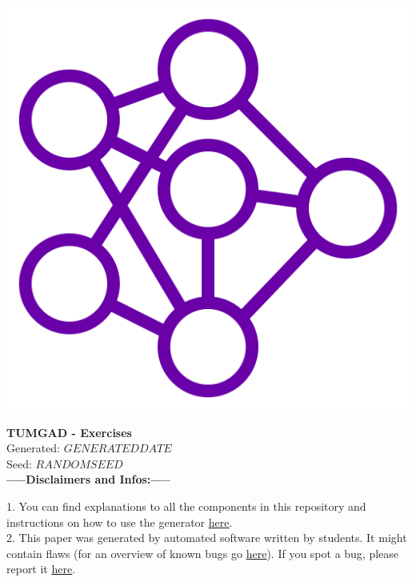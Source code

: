 \documentclass[12pt]{article}
\begin{document}
    \begin{center}
        \includegraphics[scale=0.25]{favicon.png} %
        \vspace{15px}

        {\selectfont
            \textbf{\LARGE{TUMGAD - Exercises}}\\
            Generated: $GENERATEDDATE$\\
            Seed: $RANDOMSEED$\\
        }
        \vspace{20px}
        \textbf{\LARGE{-----Disclaimers and Infos:-----}}
        \\[0.2in]
    \end{center}
    1. You can find explanations to all the components in this repository and instructions on how to use the generator \href{https://ossner.github.io/TUMGAD/src/routes}{\underline{here}}.
    \\[0.2in]
    2. This paper was generated by automated software written by students.
    It might contain flaws (for an overview of known bugs go \href{https://github.com/ossner/TUMGAD/issues?q=is%3Aissue+is%3Aopen+label%3A%22bug+%F0%9F%90%9B%22}{here}).
    If you spot a bug, please report it \href{https://github.com/ossner/TUMGAD/issues/new?assignees=&labels=&template=bug_report.md&title=}{\underline{here}}.
\end{document}
